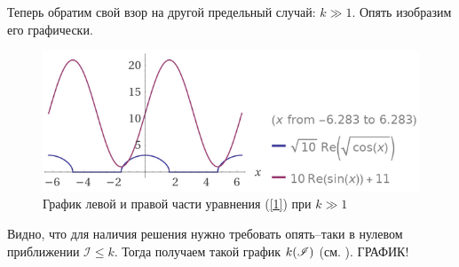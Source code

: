 \documentclass[a4paper,9pt,russian]{article}
\newcommand{\I}{\mathscr{I}}
\renewcommand{\-}{\bar}
\begin{document}
\par
Теперь обратим свой взор на другой предельный случай: $k \gg 1$. Опять изобразим его графически.
\begin{figure}[h]
 \centering
 \includegraphics[width = 100 mm]{graf2.png}
 \caption{График левой и правой части уравнения (\ref{1}) при $k \gg 1$}
 \label{graf}
\end{figure}
\par
Видно, что для наличия решения нужно требовать опять--таки в нулевом приближении $\I \le k$. Тогда получаем такой график $k \qty(\I)$ (см. ).
{ ГРАФИК!}
\end{document}
